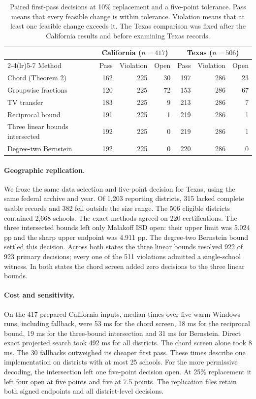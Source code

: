 \documentclass[11pt]{article}
\begin{document}
\begin{table}[ht]
\centering
\caption{Paired first-pass decisions at 10\% replacement and a five-point tolerance. Pass means that every feasible change is within tolerance. Violation means that at least one feasible change exceeds it. The Texas comparison was fixed after the California results and before examining Texas records.}\label{tab:screens}
\begin{tabular}{lrrrrrr}
\toprule
&\multicolumn{3}{c}{California ($n=417$)}&\multicolumn{3}{c}{Texas ($n=506$)}\\
\cmidrule(lr){2-4}\cmidrule(lr){5-7}
Method & Pass & Violation & Open & Pass & Violation & Open\\
\midrule
Chord (Theorem 2)&162&225&30&197&286&23\\
Groupwise fractions&120&225&72&153&286&67\\
TV transfer&183&225&9&213&286&7\\
Reciprocal bound&191&225&1&219&286&1\\
Three linear bounds intersected&192&225&0&219&286&1\\
Degree-two Bernstein&192&225&0&220&286&0\\
\bottomrule
\end{tabular}
\end{table}

\paragraph{Geographic replication.}
We froze the same data selection and five-point decision for Texas, using the same federal archive and year. Of 1,203 reporting districts, 315 lacked complete usable records and 382 fell outside the size range. The 506 eligible districts contained 2,668 schools. The exact methods agreed on 220 certifications. The three intersected bounds left only Malakoff ISD open: their upper limit was 5.024 pp and the sharp upper endpoint was 4.911 pp. The degree-two Bernstein bound settled this decision. Across both states the three linear bounds resolved 922 of 923 primary decisions; every one of the 511 violations admitted a single-school witness. In both states the chord screen added zero decisions to the three linear bounds.

\paragraph{Cost and sensitivity.}
On the 417 prepared California inputs, median times over five warm Windows runs, including fallback, were 53 ms for the chord screen, 18 ms for the reciprocal bound, 19 ms for the three-bound intersection and 31 ms for Bernstein. Direct exact projected search took 492 ms for all districts. The chord screen alone took 8 ms. The 30 fallbacks outweighed its cheaper first pass. These times describe one implementation on districts with at most 25 schools. For the more permissive decoding, the intersection left one five-point decision open. At 25\% replacement it left four open at five points and five at 7.5 points. The replication files retain both signed endpoints and all district-level decisions.
\end{document}
